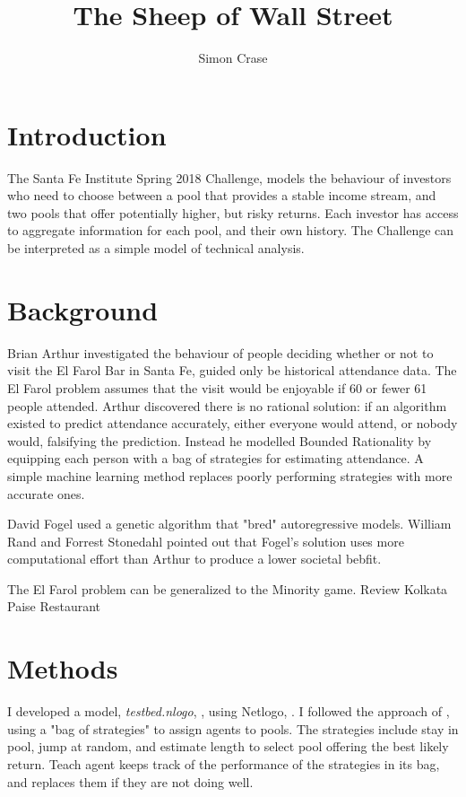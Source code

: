 \documentclass[]{article}
\title{The Sheep of Wall Street}
\author{Simon Crase}
\begin{document}
\maketitle

\begin{abstract}

\end{abstract}

\section{Introduction}
The Santa Fe Institute Spring 2018 Challenge\cite{Challenge:2018}, models the behaviour of investors who need to choose between a pool that provides a stable income stream, and two pools that offer potentially higher, but risky returns. Each investor has access to aggregate information for each pool, and their own history. The Challenge can be interpreted as a simple model of technical analysis\cite{wiki:technical}.

\section{Background}
Brian Arthur \cite{arthur1994inductive} investigated the behaviour of people deciding whether or not to visit the El Farol Bar in Santa Fe, guided only be historical attendance data. The El Farol problem assumes that the visit would be enjoyable if 60 or fewer 61 people attended. Arthur discovered there is no rational solution: if an algorithm existed to predict attendance accurately, either everyone would attend, or nobody would, falsifying the prediction. Instead he modelled Bounded Rationality by equipping each person with a bag of strategies for estimating attendance. A simple machine learning method replaces poorly performing strategies with more accurate ones.


David Fogel \cite{fogel1999inductive} used a genetic algorithm that "bred" autoregressive models. William Rand and Forrest Stonedahl\cite{rand2007farol} pointed out that Fogel's solution uses more computational effort than Arthur to produce a lower societal bebfit.

The El Farol problem can be generalized to the Minority game. Review \cite{szabo2007evolutionary} Kolkata Paise Restaurant \cite{chakrabarti2007kolkata}
\cite{chakrabarti2009kolkata}

\section{Methods}
I developed a model, \emph{testbed.nlogo}, \cite{Github:2018}, using Netlogo, \cite{Wilensky:1999}. I followed the approach of \cite{arthur1994inductive}, using a "bag of strategies" to assign agents to pools. The strategies include stay in pool, jump at random, and estimate length to select pool offering the best likely return. Teach agent keeps track of the performance of the strategies in its bag, and replaces them if they are not doing well.
\end{document}
